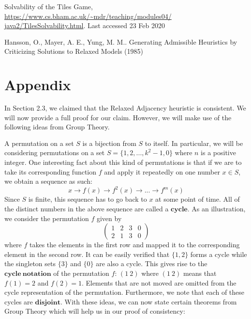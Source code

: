 \documentclass[runningheads]{llncs}
\begin{document}
%
%
%
% 
% 
%
\begin{thebibliography}{8}
Solvability of the Tiles Game,
\url{https://www.cs.bham.ac.uk/~mdr/teaching/modules04/
java2/TilesSolvability.html}.
Last accessed 23 Feb 2020

Hansson, O., Mayer, A. E., Yung, M. M.. Generating Admissible Heuristics by Criticizing Solutions to Relaxed Models (1985)
\end{thebibliography}

\section{Appendix}
In Section 2.3, we claimed that the Relaxed Adjacency heuristic is consistent. We will now provide a full proof for our claim. However, we will make use of the following ideas from Group Theory.

A permutation on a set $S$ is a bijection from $S$ to itself. In particular, we will be considering permutations on a set $S = \{1, 2, ..., k^2 - 1, 0\}$ where $n$ is a positive integer. One interesting fact about this kind of permutations is that if we are to take its corresponding function $f$ and apply it repeatedly on one number $x \in S$, we obtain a sequence as such:
$$
x \to f(x) \to f^{2}(x) \to ... \to f^{m}(x)
$$
Since $S$ is finite, this sequence has to go back to $x$ at some point of time. All of the distinct numbers in the above sequence are called a $\mathbf{cycle}$. As an illustration, we consider the permutation $f$ given by
\begin{equation*}
    \begin{pmatrix}
    1 & 2 & 3 & 0 \\
    2 & 1 & 3 & 0
    \end{pmatrix}
\end{equation*}
where $f$ takes the elements in the first row and mapped it to the corresponding element in the second row. It can be easily verified that $\{ 1, 2\}$ forms a cycle while the singleton sets $\{3\}$ and $\{0\}$ are also a cycle. This gives rise to the $\mathbf{cycle \ notation}$ of the permutation $f$: $(1 \ 2)$ where $(1 \ 2)$ means that $f(1) = 2$ and $f(2) = 1$. Elements that are not moved are omitted from the cycle representation of the permutation. Furthermore, we note that each of these cycles are $\mathbf{disjoint}$. With these ideas, we can now state certain theorems from Group Theory which will help us in our proof of consistency:
\end{document}
